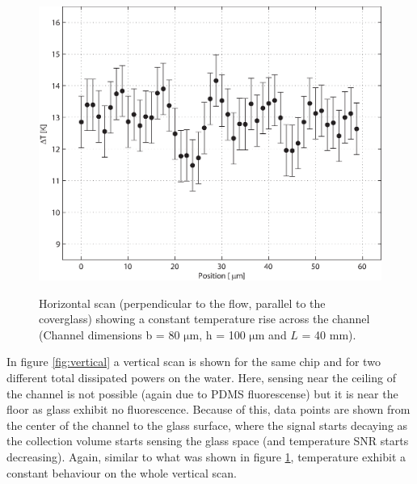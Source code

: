 \documentclass[twocolumn]{svjour3}       %
\begin{document}
\begin{figure}[h!]
\centering
\includegraphics[width=\columnwidth]{figs/horizontal.eps}
\label{fig:horizontal}
\caption{Horizontal scan (perpendicular to the flow, parallel to the coverglass) showing a constant temperature rise across the channel (Channel dimensions  b = 80 $\mathrm{\mu m}$, h = 100 $\mathrm{\mu m}$ and $L$ = 40 mm).}
\end{figure}

In figure \ref{fig:vertical} a vertical scan is shown for the same chip and for two different total dissipated powers on the water. Here, sensing near the ceiling of the channel is not possible (again due to PDMS fluorescense) but it is near the floor as glass exhibit no fluorescence. Because of this, data points are shown from the center of the channel to the glass surface, where the signal starts decaying as the collection volume starts sensing the glass space (and temperature SNR starts decreasing). Again, similar to what was shown in figure \ref{fig:horizontal}, temperature exhibit a constant behaviour on the whole vertical scan.
\end{document}
